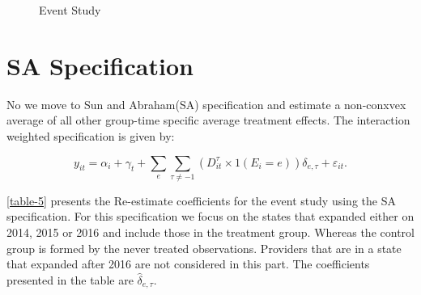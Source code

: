 \documentclass[
  12pt,
]{article}
\begin{document}
\begin{figure}
\caption{Event Study}\label{fig:Fig-3}
\end{figure}
\newpage

\hypertarget{sa-specification}{%
\section{SA Specification}\label{sa-specification}}

No we move to Sun and Abraham(SA) specification and estimate a
non-conxvex average of all other group-time specific average treatment
effects. The interaction weighted specification is given by:

\begin{equation}\label{eq:iwevent}
y_{it} = \alpha_{i} + \gamma_{t} +\sum_{e} \sum_{\tau \neq -1} \left(D_{it}^{\tau} \times 1(E_{i}=e)\right) \delta_{e, \tau} + \varepsilon_{it}.
\end{equation}

\ref{table-5} presents the Re-estimate coefficients for the event study
using the SA specification. For this specification we focus on the
states that expanded either on 2014, 2015 or 2016 and include those in
the treatment group. Whereas the control group is formed by the never
treated observations. Providers that are in a state that expanded after
2016 are not considered in this part. The coefficients presented in the
table are \(\hat{\delta}_{e, \tau}\).
\end{document}
